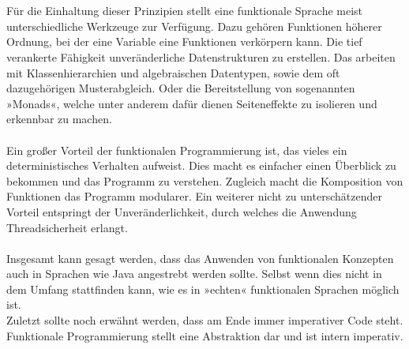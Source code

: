 \\\\
Für die Einhaltung dieser Prinzipien stellt eine funktionale Sprache meist unterschiedliche Werkzeuge zur Verfügung. Dazu gehören Funktionen höherer Ordnung, bei der eine Variable eine Funktionen verkörpern kann. Die tief verankerte Fähigkeit unveränderliche Datenstrukturen zu erstellen. Das arbeiten mit Klassenhierarchien und algebraischen Datentypen, sowie dem oft dazugehörigen Musterabgleich. Oder die Bereitstellung von sogenannten »Monads«, welche unter anderem dafür dienen Seiteneffekte zu isolieren und erkennbar zu machen.
\\\\
Ein großer Vorteil der funktionalen Programmierung ist, das vieles ein deterministisches Verhalten aufweist. Dies macht es einfacher einen Überblick zu bekommen und das Programm zu verstehen. Zugleich macht die Komposition von Funktionen das Programm modularer. Ein weiterer nicht zu unterschätzender Vorteil entspringt der Unveränderlichkeit, durch welches die Anwendung Threadsicherheit erlangt.
\\\\
Insgesamt kann gesagt werden, dass das Anwenden von funktionalen Konzepten auch in Sprachen wie Java angestrebt werden sollte. Selbst wenn dies nicht in dem Umfang stattfinden kann, wie es in »echten« funktionalen Sprachen möglich ist. 
\\
Zuletzt sollte noch erwähnt werden, dass am Ende immer imperativer Code steht. Funktionale Programmierung stellt eine Abstraktion dar und ist intern imperativ.

